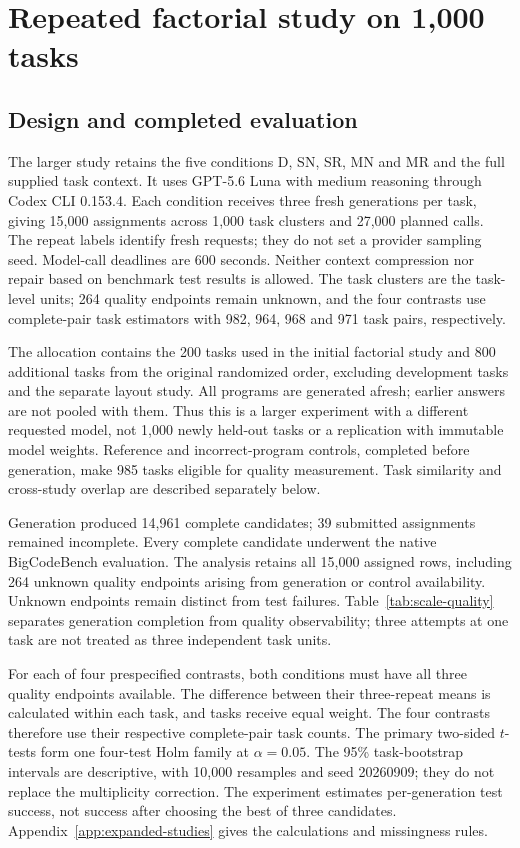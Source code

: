 \section{Repeated factorial study on 1,000 tasks}
\label{sec:scale-results}
\subsection{Design and completed evaluation}
The larger study retains the five conditions D, SN, SR, MN and MR and the full supplied task context. It uses GPT-5.6 Luna with medium reasoning through Codex CLI 0.153.4. Each condition receives three fresh generations per task, giving 15,000 assignments across 1,000 task clusters and 27,000 planned calls. The repeat labels identify fresh requests; they do not set a provider sampling seed. Model-call deadlines are 600 seconds. Neither context compression nor repair based on benchmark test results is allowed. The task clusters are the task-level units; 264 quality endpoints remain unknown, and the four contrasts use complete-pair task estimators with 982, 964, 968 and 971 task pairs, respectively.

The allocation contains the 200 tasks used in the initial factorial study and 800 additional tasks from the original randomized order, excluding development tasks and the separate layout study. All programs are generated afresh; earlier answers are not pooled with them. Thus this is a larger experiment with a different requested model, not 1,000 newly held-out tasks or a replication with immutable model weights. Reference and incorrect-program controls, completed before generation, make 985 tasks eligible for quality measurement. Task similarity and cross-study overlap are described separately below.

Generation produced 14,961 complete candidates; 39 submitted assignments remained incomplete. Every complete candidate underwent the native BigCodeBench evaluation. The analysis retains all 15,000 assigned rows, including 264 unknown quality endpoints arising from generation or control availability. Unknown endpoints remain distinct from test failures. Table~\ref{tab:scale-quality} separates generation completion from quality observability; three attempts at one task are not treated as three independent task units.


For each of four prespecified contrasts, both conditions must have all three quality endpoints available. The difference between their three-repeat means is calculated within each task, and tasks receive equal weight. The four contrasts therefore use their respective complete-pair task counts. The primary two-sided $t$-tests form one four-test Holm family at $\alpha=0.05$. The 95\% task-bootstrap intervals are descriptive, with 10,000 resamples and seed 20260909; they do not replace the multiplicity correction. The experiment estimates per-generation test success, not success after choosing the best of three candidates. Appendix~\ref{app:expanded-studies} gives the calculations and missingness rules.

